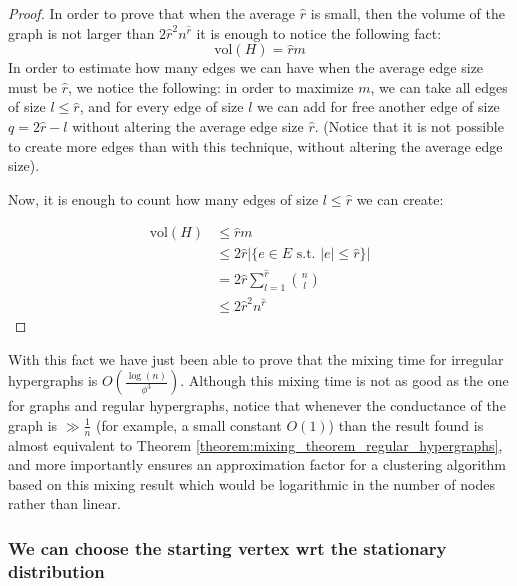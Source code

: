 \documentclass[../main.tex]{subfiles}
\begin{document}
\begin{proof}
    In order to prove that when the average $\hat{r}$ is small, then the volume of the graph is not larger than $2 \hat{r}^2 n^{\hat{r}}$ it is enough to notice the following fact: 
    \begin{equation}
        \text{vol}(H) = \hat{r} m
    \end{equation}
    In order to estimate how many edges we can have when the average edge size must be $\hat{r}$, we notice the following: in order to maximize $m$, we can take all edges of size $l\leq \hat{r}$, and for every edge of size $l$ we can add for free another edge of size $q = 2\hat{r} - l$ without altering the average edge size $\hat{r}$. (Notice that it is not possible to create more edges than with this technique, without altering the average edge size).
    
    Now, it is enough to count how many edges of size $l\leq \hat{r}$ we can create:
    
    \begin{align}
        \text{vol}(H) & \leq \hat{r} m \\ 
        & \leq 2 \hat{r} \left|\{e\in E \text{ s.t. } |e| \leq \hat{r}\}\right| \\
        & = 2\hat{r} \sum_{l=1}^{
        \hat{r}} {n\choose l} \\ 
        & \leq 2 \hat{r}^2 n^{\hat{r}}
    \end{align}
\end{proof}

With this fact we have just been able to prove that the mixing time for irregular hypergraphs is $O\left(\frac{\log(n)}{\phi^3}\right)$. Although this mixing time is not as good as the one for graphs and regular hypergraphs, notice that whenever the conductance of the graph is $\gg \frac{1}{n}$ (for example, a small constant $O(1)$) than the result found is almost equivalent to Theorem \ref{theorem:mixing_theorem_regular_hypergraphs}, and more importantly ensures an approximation factor for a clustering algorithm based on this mixing result which would be logarithmic in the number of nodes rather than linear.
 
\subsubsection{We can choose the starting vertex wrt the stationary distribution}
\label{subsec:choose_starting_vertex_random}
\end{document}
